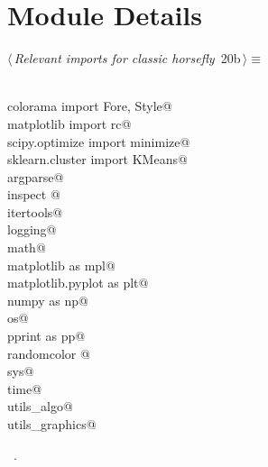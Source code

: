 \documentclass[11.5pt]{report}
\begin{document}
\section{Module Details}

\newchunk 

\begin{flushleft} \small\label{scrap22}\raggedright\small
{} $\langle\,${\itshape Relevant imports for classic horsefly}\nobreak\ {\footnotesize {20b}}$\,\rangle\equiv$
\vspace{-1ex}
\begin{list}{}{} \item
\mbox{}\verb@@\\
\mbox{}\verb@from colorama import Fore, Style@\\
\mbox{}\verb@from matplotlib import rc@\\
\mbox{}\verb@from scipy.optimize import minimize@\\
\mbox{}\verb@from sklearn.cluster import KMeans@\\
\mbox{}\verb@import argparse@\\
\mbox{}\verb@import inspect @\\
\mbox{}\verb@import itertools@\\
\mbox{}\verb@import logging@\\
\mbox{}\verb@import math@\\
\mbox{}\verb@import matplotlib as mpl@\\
\mbox{}\verb@import matplotlib.pyplot as plt@\\
\mbox{}\verb@import numpy as np@\\
\mbox{}\verb@import os@\\
\mbox{}\verb@import pprint as pp@\\
\mbox{}\verb@import randomcolor @\\
\mbox{}\verb@import sys@\\
\mbox{}\verb@import time@\\
\mbox{}\verb@import utils_algo@\\
\mbox{}\verb@import utils_graphics@\\
\mbox{}\verb@@{\NWsep}
\end{list}
\vspace{-1.5ex}
\footnotesize
\begin{list}{}{\setlength{\itemsep}{-\parsep}\setlength{\itemindent}{-\leftmargin}}
\item \NWtxtMacroRefIn\ .

\item{}
\end{list}
\vspace{4ex}
\end{flushleft}
\end{document}
